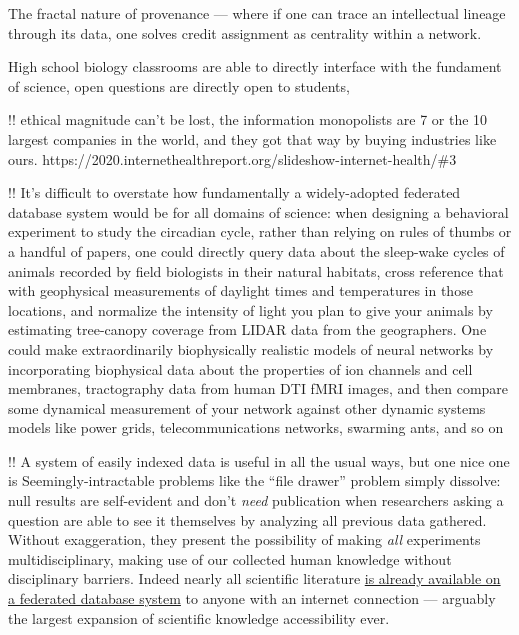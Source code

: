 \documentclass[10pt]{article}
\begin{document}
\begin{multicols}{2}
The fractal nature of provenance --- where if one can trace an
intellectual lineage through its data, one solves credit assignment as
centrality within a network.

High school biology classrooms are able to directly interface with the
fundament of science, open questions are directly open to students,

!! ethical magnitude can't be lost, the information monopolists are 7 or
the 10 largest companies in the world, and they got that way by buying
industries like ours.
https://2020.internethealthreport.org/slideshow-internet-health/\#3

!! It's difficult to overstate how fundamentally a widely-adopted
federated database system would be for all domains of science: when
designing a behavioral experiment to study the circadian cycle, rather
than relying on rules of thumbs or a handful of papers, one could
directly query data about the sleep-wake cycles of animals recorded by
field biologists in their natural habitats, cross reference that with
geophysical measurements of daylight times and temperatures in those
locations, and normalize the intensity of light you plan to give your
animals by estimating tree-canopy coverage from LIDAR data from the
geographers. One could make extraordinarily biophysically realistic
models of neural networks by incorporating biophysical data about the
properties of ion channels and cell membranes, tractography data from
human DTI fMRI images, and then compare some dynamical measurement of
your network against other dynamic systems models like power grids,
telecommunications networks, swarming ants, and so on

!! A system of easily indexed data is useful in all the usual ways, but
one nice one is Seemingly-intractable problems like the ``file drawer''
problem simply dissolve: null results are self-evident and don't
\emph{need} publication when researchers asking a question are able to
see it themselves by analyzing all previous data gathered. Without
exaggeration, they present the possibility of making \emph{all}
experiments multidisciplinary, making use of our collected human
knowledge without disciplinary barriers. Indeed nearly all scientific
literature \href{https://freeread.org/ipfs/}{is already available on a
federated database system} to anyone with an internet connection ---
arguably the largest expansion of scientific knowledge accessibility
ever. 
\end{multicols}


 
\end{document}
